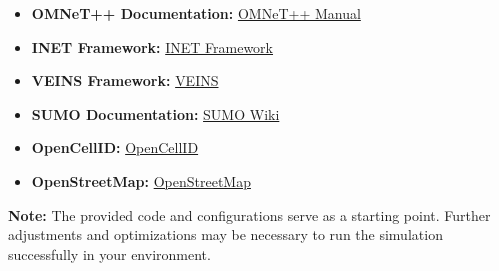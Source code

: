 \documentclass{article}
\begin{document}
		\begin{itemize}
			\item \textbf{OMNeT++ Documentation:} \href{https://doc.omnetpp.org/omnetpp/manual/}{OMNeT++ Manual}
			\item \textbf{INET Framework:} \href{https://inet.omnetpp.org/}{INET Framework}
			\item \textbf{VEINS Framework:} \href{https://veins.car2x.org/}{VEINS}
			\item \textbf{SUMO Documentation:} \href{https://sumo.dlr.de/docs/index.html}{SUMO Wiki}
			\item \textbf{OpenCellID:} \href{https://opencellid.org/}{OpenCellID}
			\item \textbf{OpenStreetMap:} \href{https://www.openstreetmap.org/}{OpenStreetMap}
		\end{itemize}
		
		\textbf{Note:} The provided code and configurations serve as a starting point. Further adjustments and optimizations may be necessary to run the simulation successfully in your environment.
		
	
\end{document}
